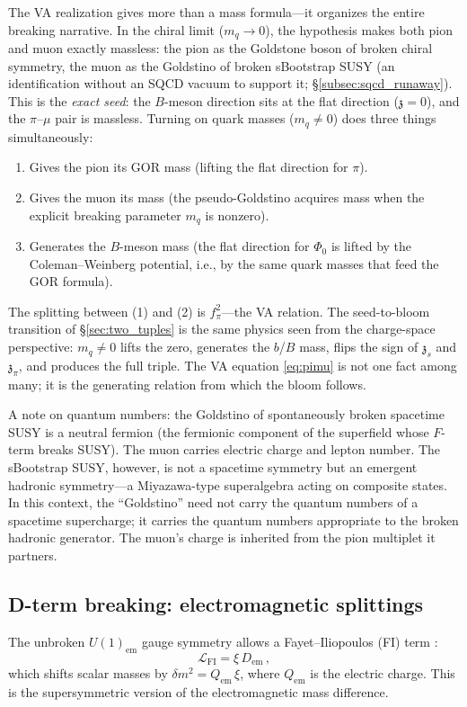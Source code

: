 \documentclass[12pt,a4paper]{article}
\newcommand{\zch}{\mathfrak{z}}
\begin{document}
The VA realization gives more than a mass formula---it organizes the 
entire breaking narrative. In the chiral limit ($m_q \to 0$), the hypothesis makes both
pion and muon exactly massless: the pion as the Goldstone boson
of broken chiral symmetry, the muon as the Goldstino of broken
sBootstrap SUSY (an identification without an SQCD vacuum to support
it; \S\ref{subsec:sqcd_runaway}). This is the \emph{exact seed}: the $B$-meson 
direction sits at the flat direction ($\zch = 0$), and the 
$\pi$--$\mu$ pair is massless. Turning on quark masses ($m_q \neq 0$) 
does three things simultaneously:
\begin{enumerate}
\item Gives the pion its GOR mass (lifting the flat direction for $\pi$).
\item Gives the muon its mass (the pseudo-Goldstino acquires mass 
when the explicit breaking parameter $m_q$ is nonzero).
\item Generates the $B$-meson mass (the flat direction for $\Phi_0$ 
is lifted by the Coleman--Weinberg potential, i.e., by the same 
quark masses that feed the GOR formula).
\end{enumerate}
The splitting between (1) and (2) is $f_\pi^2$---the VA relation. 
The seed-to-bloom transition of \S\ref{sec:two_tuples} is the same 
physics seen from the charge-space perspective: $m_q \neq 0$ lifts 
the zero, generates the $b$/$B$ mass, flips the sign of $\zch_s$ 
and $\zch_\pi$, and produces the full triple. The VA equation 
\eqref{eq:pimu} is not one fact among many; it is the generating 
relation from which the bloom follows.

A note on quantum numbers: the Goldstino of spontaneously broken 
spacetime SUSY is a neutral fermion (the fermionic component of the 
superfield whose $F$-term breaks SUSY). The muon carries electric 
charge and lepton number. The sBootstrap SUSY, however, is not a 
spacetime symmetry but an emergent hadronic symmetry---a 
Miyazawa-type superalgebra \cite{Miyazawa} acting on composite 
states. In this context, the ``Goldstino'' need not carry the 
quantum numbers of a spacetime supercharge; it carries the quantum 
numbers appropriate to the broken hadronic generator. The muon's 
charge is inherited from the pion multiplet it partners.

\subsection{D-term breaking: electromagnetic splittings}
\label{subsec:dterm}
The unbroken $U(1)_{\text{em}}$ gauge symmetry allows a 
Fayet--Iliopoulos (FI) term \cite{FayetIliopoulos}:
\begin{equation}
\mathcal{L}_{\text{FI}} = \xi\,D_{\text{em}}\,,
\end{equation}
which shifts scalar masses by $\delta m^2 = Q_{\text{em}}\,\xi$, 
where $Q_{\text{em}}$ is the electric charge. This is the 
supersymmetric version of the electromagnetic mass difference.
\end{document}
